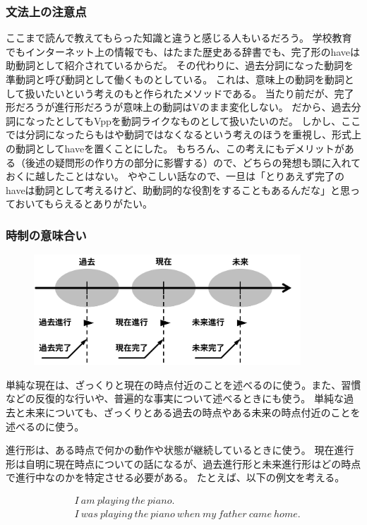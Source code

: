 \documentclass[11pt,a4paper,titlepage]{jsarticle}
\begin{document}
\subsubsection{文法上の注意点}

ここまで読んで教えてもらった知識と違うと感じる人もいるだろう。
学校教育でもインターネット上の情報でも、はたまた歴史ある辞書でも、完了形のhaveは助動詞として紹介されているからだ。
その代わりに、過去分詞になった動詞を準動詞と呼び動詞として働くものとしている。
これは、意味上の動詞を動詞として扱いたいという考えのもと作られたメソッドである。
当たり前だが、完了形だろうが進行形だろうが意味上の動詞はVのまま変化しない。
だから、過去分詞になったとしてもVppを動詞ライクなものとして扱いたいのだ。
しかし、ここでは分詞になったらもはや動詞ではなくなるという考えのほうを重視し、形式上の動詞としてhaveを置くことにした。
もちろん、この考えにもデメリットがある（後述の疑問形の作り方の部分に影響する）ので、どちらの発想も頭に入れておくに越したことはない。
ややこしい話なので、一旦は「とりあえず完了のhaveは動詞として考えるけど、助動詞的な役割をすることもあるんだな」と思っておいてもらえるとありがたい。

\subsubsection{時制の意味合い}

\begin{figure}[H]
  \centering
  \includegraphics[width=100mm]{fig01.png}
\end{figure}

単純な現在は、ざっくりと現在の時点付近のことを述べるのに使う。また、習慣などの反復的な行いや、普遍的な事実について述べるときにも使う。
単純な過去と未来についても、ざっくりとある過去の時点やある未来の時点付近のことを述べるのに使う。

進行形は、ある時点で何かの動作や状態が継続しているときに使う。
現在進行形は自明に現在時点についての話になるが、過去進行形と未来進行形はどの時点で進行中なのかを特定させる必要がある。
たとえば、以下の例文を考える。

\begin{align}
  &I ~ am ~ playing ~ the ~ piano \text{.}\\
  &I ~ was ~ playing ~ the ~ piano ~ when ~ my ~ father ~ came ~ home \text{.}
\end{align}
\end{document}
